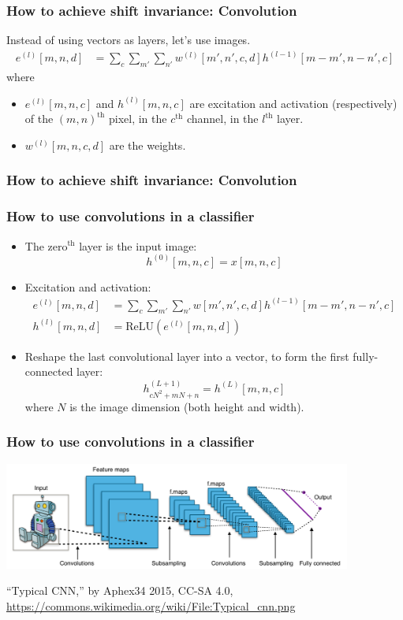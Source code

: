 \documentclass{beamer}
\begin{document}
\begin{frame}
  \frametitle{How to achieve shift invariance: Convolution}

  Instead of using vectors as layers, let's use images.
  \begin{align*}
    e^{(l)}[m,n,d] &= \sum_c\sum_{m'}\sum_{n'} w^{(l)}[m',n',c,d]h^{(l-1)}[m-m',n-n',c]
  \end{align*}
  where
  \begin{itemize}
  \item $e^{(l)}[m,n,c]$ and $h^{(l)}[m,n,c]$ are excitation and
    activation (respectively) of the $(m,n)^{\textrm{th}}$ pixel, in
    the $c^{\textrm{th}}$ channel, in the $l^{\textrm{th}}$ layer.
  \item $w^{(l)}[m,n,c,d]$ are the weights.
  \end{itemize}
\end{frame}

\begin{frame}
  \frametitle{How to achieve shift invariance: Convolution}

  \centerline{}
\end{frame}

\begin{frame}
  \frametitle{How to use convolutions in a classifier}
  \begin{itemize}
  \item The zero$^{\textrm{th}}$ layer is the input image:
    \[
    h^{(0)}[m,n,c] = x[m,n,c]
    \]
  \item Excitation and activation:
    \begin{align*}
      e^{(l)}[m,n,d] &= \sum_c\sum_{m'}\sum_{n'} w[m',n',c,d]h^{(l-1)}[m-m',n-n',c]\\
      h^{(l)}[m,n,d] &= \mbox{ReLU}\left(e^{(l)}[m,n,d]\right)
    \end{align*}
  \item Reshape the last convolutional layer into a vector, to form
    the first fully-connected layer:
    \[
    h^{(L+1)}_{cN^2+mN+n} = h^{(L)}[m,n,c]
    \]
    where $N$ is the image dimension  (both height and width).
  \end{itemize}
\end{frame}
      
\begin{frame}
  \frametitle{How to use convolutions in a classifier}

  \centerline{\includegraphics[width=4.5in]{figs/Typical_cnn.png}}
  \begin{tiny}
    ``Typical CNN,'' by Aphex34 2015, CC-SA 4.0,
    \url{https://commons.wikimedia.org/wiki/File:Typical_cnn.png}
  \end{tiny}
\end{frame}
\end{document}
